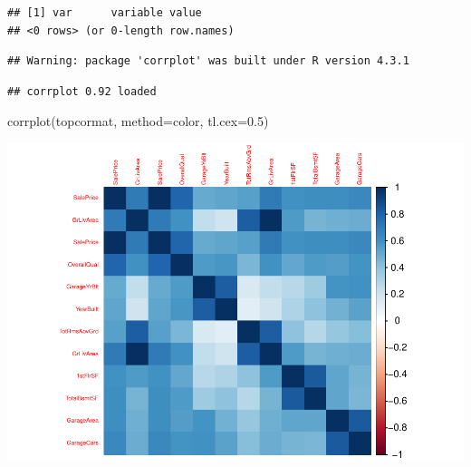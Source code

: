 \documentclass[aoas]{imsart}
\newenvironment{Shaded}{\begin{snugshade}}{\end{snugshade}}
\newcommand{\AttributeTok}[1]{\textcolor[rgb]{0.77,0.63,0.00}{#1}}
\newcommand{\CommentTok}[1]{\textcolor[rgb]{0.56,0.35,0.01}{\textit{#1}}}
\newcommand{\FloatTok}[1]{\textcolor[rgb]{0.00,0.00,0.81}{#1}}
\newcommand{\FunctionTok}[1]{\textcolor[rgb]{0.00,0.00,0.00}{#1}}
\newcommand{\NormalTok}[1]{#1}
\newcommand{\OtherTok}[1]{\textcolor[rgb]{0.56,0.35,0.01}{#1}}
\newcommand{\SpecialCharTok}[1]{\textcolor[rgb]{0.00,0.00,0.00}{#1}}
\newcommand{\StringTok}[1]{\textcolor[rgb]{0.31,0.60,0.02}{#1}}
\numberwithin{equation}{section}
\theoremstyle{plain}
\theoremstyle{remark}
\begin{document}
\begin{verbatim}
## [1] var      variable value   
## <0 rows> (or 0-length row.names)
\end{verbatim}

\begin{Shaded}
\end{Shaded}

\begin{verbatim}
## Warning: package 'corrplot' was built under R version 4.3.1
\end{verbatim}

\begin{verbatim}
## corrplot 0.92 loaded
\end{verbatim}

\begin{Shaded}
\begin{Highlighting}[]
\FunctionTok{corrplot}\NormalTok{(topcormat, }\AttributeTok{method=}\StringTok{\textquotesingle{}color\textquotesingle{}}\NormalTok{, }\AttributeTok{tl.cex=}\FloatTok{0.5}\NormalTok{)}
\end{Highlighting}
\end{Shaded}

\includegraphics{STAT-444-FINAL-PROJECT-PROPOSAL_files/figure-latex/unnamed-chunk-6-1.pdf}
\end{document}

